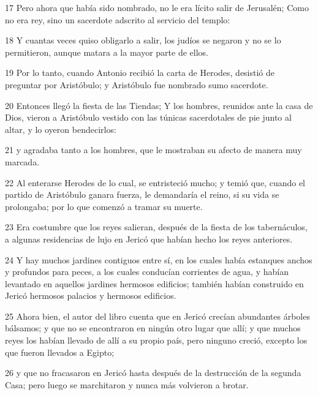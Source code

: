 \par 17 Pero ahora que había sido nombrado, no le era lícito salir de Jerusalén; Como no era rey, sino un sacerdote adscrito al servicio del templo:

\par 18 Y cuantas veces quiso obligarlo a salir, los judíos se negaron y no se lo permitieron, aunque matara a la mayor parte de ellos.

\par 19 Por lo tanto, cuando Antonio recibió la carta de Herodes, desistió de preguntar por Aristóbulo; y Aristóbulo fue nombrado sumo sacerdote.

\par 20 Entonces llegó la fiesta de las Tiendas; Y los hombres, reunidos ante la casa de Dios, vieron a Aristóbulo vestido con las túnicas sacerdotales de pie junto al altar, y lo oyeron bendecirlos:

\par 21 y agradaba tanto a los hombres, que le mostraban su afecto de manera muy marcada.

\par 22 Al enterarse Herodes de lo cual, se entristeció mucho; y temió que, cuando el partido de Aristóbulo ganara fuerza, le demandaría el reino, si su vida se prolongaba; por lo que comenzó a tramar su muerte.

\par 23 Era costumbre que los reyes salieran, después de la fiesta de los tabernáculos, a algunas residencias de lujo en Jericó que habían hecho los reyes anteriores.

\par 24 Y hay muchos jardines contiguos entre sí, en los cuales había estanques anchos y profundos para peces, a los cuales conducían corrientes de agua, y habían levantado en aquellos jardines hermosos edificios; también habían construido en Jericó hermosos palacios y hermosos edificios.

\par 25 Ahora bien, el autor del libro cuenta que en Jericó crecían abundantes árboles bálsamos; y que no se encontraron en ningún otro lugar que allí; y que muchos reyes los habían llevado de allí a su propio país, pero ninguno creció, excepto los que fueron llevados a Egipto;

\par 26 y que no fracasaron en Jericó hasta después de la destrucción de la segunda Casa; pero luego se marchitaron y nunca más volvieron a brotar.

